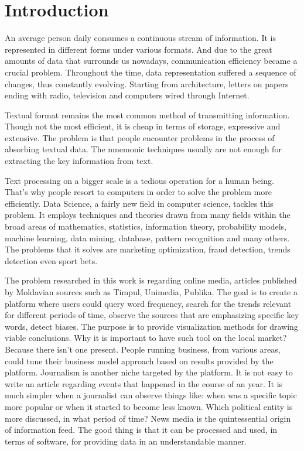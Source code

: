 \section*{Introduction}
An average person daily consumes a continuous stream of information. It is represented in different forms under various formats. And due to the great amounts of data that surrounds us nowadays, communication efficiency became a crucial problem. Throughout the time, data representation suffered a sequence of changes, thus constantly evolving. Starting from architecture, letters on papers ending with radio, television and computers wired through Internet.

Textual format remains the most common method of transmitting information. Though not the most efficient, it is cheap in terms of storage, expressive and extensive. The problem is that people encounter problems in the process of absorbing textual data. The mnemonic techniques usually are not enough for extracting the key information from text.

Text processing on a bigger scale is a tedious operation for a human being. That's why people resort to computers in order to solve the problem more efficiently. Data Science, a fairly new field in computer science, tackles this problem. It employs techniques and theories drawn from many fields within the broad areas of mathematics, statistics, information theory, probability models, machine learning, data mining, database, pattern recognition and many others. The problems that it solves are marketing optimization, fraud detection, trends detection even sport bets.

The problem researched in this work is regarding online media, articles published by Moldavian sources such as Timpul, Unimedia, Publika. The goal is to create a platform where users could query word frequency, search for the trends relevant for different periods of time, observe the sources that are emphasizing specific key words, detect biases. The purpose is to provide visualization methods for drawing viable conclusions. Why it is important to have such tool on the local market? Because there isn't one present. People running business, from various areas, could tune their business model approach based on results provided by the platform. Journalism is another niche targeted by the platform. It is not easy to write an article regarding events that happened in the course of an year. It is much simpler when a journalist can observe things like: when was a specific topic more popular or when it started to become less known. Which political entity is more discussed, in what period of time? News media is the quintessential origin of information feed. The good thing is that it can be processed and used, in terms of software, for providing data in an understandable manner.

